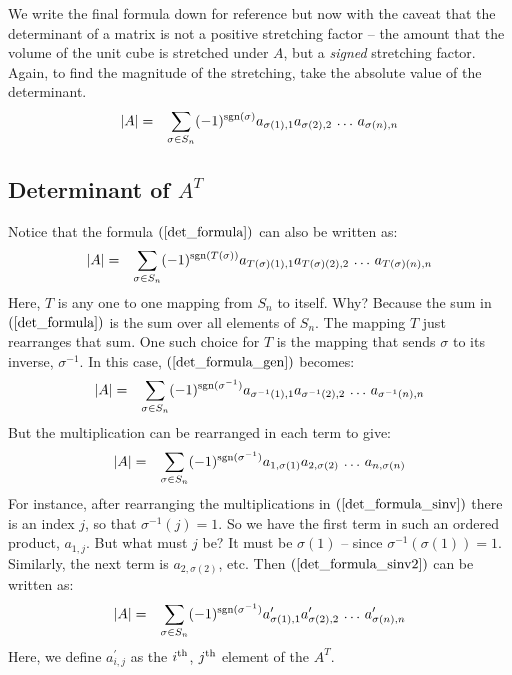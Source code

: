 \documentclass{article}
\begin{document}
We write the final formula down for reference but now with the caveat that
the determinant of a matrix is not a positive stretching factor -- the amount that the
volume of the unit cube is stretched under $A$, but a {\em signed\/} stretching
factor. Again, to find the magnitude of the stretching, take the absolute value
of the determinant.
\begin{eqnarray}
  |A| & = & \sum_{\sigma \in S_n} (-1)^{{\rm sgn}(\sigma)}
            a_{\sigma(1), 1} a_{\sigma(2),2} \, \ldots \, a_{\sigma(n), n} \label{det_formula}
\end{eqnarray}
\subsection{Determinant of $A^T$}
Notice that the formula $(\ref{det_formula})$ can also be written as:
\begin{eqnarray}
  |A| & = & \sum_{\sigma \in S_n} (-1)^{{\rm sgn}(T(\sigma))}
            a_{T(\sigma)(1), 1} a_{T(\sigma)(2),2} \, \ldots \, a_{T(\sigma)(n), n}
            \label{det_formula_gen}
\end{eqnarray}
Here, $T$ is any one to one mapping from $S_n$ to itself. Why? Because the sum in
$(\ref{det_formula})$ is the sum over all elements of $S_n$. The mapping $T$ just
rearranges that sum. One such choice for $T$ is the mapping that sends $\sigma$
to its inverse, $\sigma^{-1}$. In this case, $(\ref{det_formula_gen})$ becomes:
\begin{eqnarray}
  |A| & = & \sum_{\sigma \in S_n} (-1)^{{\rm sgn}(\sigma^{-1})}
            a_{\sigma^{-1}(1), 1} a_{\sigma^{-1}(2),2} \, \ldots \, a_{\sigma^{-1}(n), n}
            \label{det_formula_sinv}
\end{eqnarray}
But the multiplication can be rearranged in each term to give:
\begin{eqnarray}
  |A| & = & \sum_{\sigma \in S_n} (-1)^{{\rm sgn}(\sigma^{-1})}
            a_{1, \sigma(1)}  a_{2, \sigma(2)} \, \ldots \, a_{n, \sigma(n)}
            \label{det_formula_sinv2}
\end{eqnarray}
For instance, after rearranging the multiplications in $(\ref{det_formula_sinv})$
there is an index $j$, so that
$\sigma^{-1}(j) = 1$. So we have the first term in such an ordered product, $a_{1,j}$.
But what must $j$ be? It must be $\sigma(1)$ -- since $\sigma^{-1}(\sigma(1)) = 1$.
Similarly, the next term is $a_{2, \sigma(2)}$, etc. Then $(\ref{det_formula_sinv2})$
can be written as:
\begin{eqnarray}
  |A| & = & \sum_{\sigma \in S_n} (-1)^{{\rm sgn}(\sigma^{-1})} a_{\sigma(1),1}^\prime
            a_{\sigma(2),2}^\prime \, \ldots \, a_{\sigma(n),n}^\prime \label{at_proto}
\end{eqnarray}
Here, we define $a_{i,j}^\prime$ as the $i^{\rm th}$, $j^{\rm th}$ element of the $A^T$.
\end{document}
